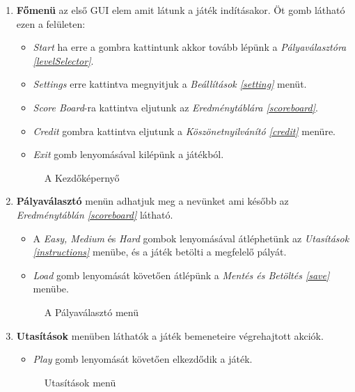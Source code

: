 \begin{enumerate}
	\item \label{fomenu} \textbf{Főmenü} az első GUI elem amit látunk a játék indításakor. Öt gomb látható ezen a felületen:
	\begin{itemize}
		\item \textit{Start} ha erre a gombra kattintunk akkor tovább lépünk a \textit{Pályaválasztóra \ref{levelSelector}}.
		\item \textit{Settings} erre kattintva megnyitjuk a \textit{Beállítások \ref{setting}} menüt.
		\item \textit{Score Board}-ra kattintva eljutunk az \textit{Eredménytáblára \ref{scoreboard}}.
		\item \textit{Credit} gombra kattintva eljutunk a \textit{Köszönetnyilvánító \ref{credit}} menüre.
		\item \textit{Exit} gomb lenyomásával kilépünk a játékból.
	\end{itemize}
	\begin{figure}[H]
		\noindent{}
		\caption{A Kezdőképernyő}
		\label{mainMenu}
	\end{figure}
	
	\item \label{levelSelector} \textbf{Pályaválasztó} menün  adhatjuk meg a nevünket ami később az \textit{Eredménytáblán \ref{scoreboard}} látható.
	\begin{itemize}
	\item A \textit{Easy, Medium} és \textit{Hard} gombok lenyomásával átléphetünk az \textit{Utasítások \ref{instructions}} menübe, és a játék betölti a megfelelő pályát.
	\item \textit{Load} gomb lenyomását követően átlépünk a \textit{Mentés és Betöltés \ref{save}} menübe.
	\end{itemize}
	\begin{figure}[H]
		\noindent{}
		\caption{A Pályaválasztó menü}
		\label{levelSelection}
	\end{figure}
	
	\item \label{instructions} \textbf{Utasítások} menüben láthatók a játék bemeneteire végrehajtott akciók.
	\begin{itemize}
		\item \textit{Play} gomb lenyomását követően elkezdődik a játék.
	\end{itemize}
	\begin{figure}[H]
		\noindent{}
		\caption{Utasítások menü}
		\label{instructionsF}
	\end{figure}	
	

\end{enumerate}
